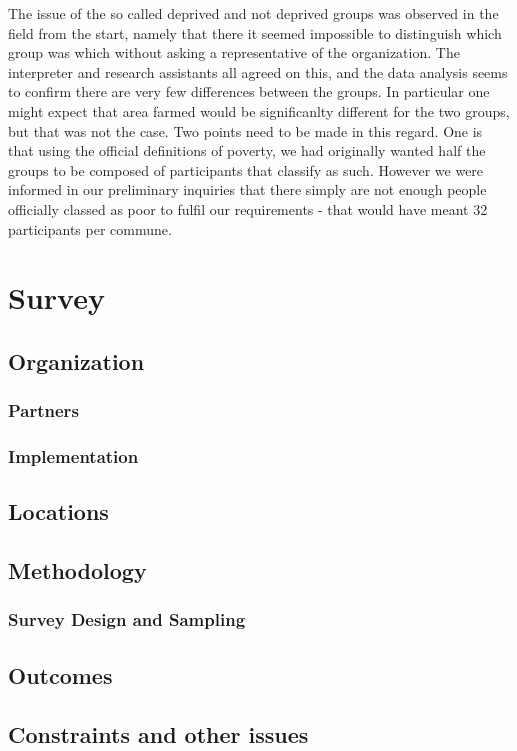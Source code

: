 \documentclass[]{article}
\begin{document}
The issue of the so called deprived and not deprived groups was observed
in the field from the start, namely that there it seemed impossible to
distinguish which group was which without asking a representative of the
organization. The interpreter and research assistants all agreed on
this, and the data analysis seems to confirm there are very few
differences between the groups. In particular one might expect that area
farmed would be significanlty different for the two groups, but that was
not the case. Two points need to be made in this regard. One is that
using the official definitions of poverty, we had originally wanted half
the groups to be composed of participants that classify as such. However
we were informed in our preliminary inquiries that there simply are not
enough people officially classed as poor to fulfil our requirements -
that would have meant 32 participants per commune.

\hypertarget{survey}{%
\section{Survey}\label{survey}}

\hypertarget{organization-1}{%
\subsection{Organization}\label{organization-1}}

\hypertarget{partners}{%
\subsubsection{Partners}\label{partners}}

\hypertarget{implementation-1}{%
\subsubsection{Implementation}\label{implementation-1}}

\hypertarget{locations-1}{%
\subsection{Locations}\label{locations-1}}

\hypertarget{methodology-1}{%
\subsection{Methodology}\label{methodology-1}}

\hypertarget{survey-design-and-sampling}{%
\subsubsection{Survey Design and
Sampling}\label{survey-design-and-sampling}}

\hypertarget{outcomes}{%
\subsection{Outcomes}\label{outcomes}}

\hypertarget{constraints-and-other-issues-1}{%
\subsection{Constraints and other
issues}\label{constraints-and-other-issues-1}}
\end{document}
